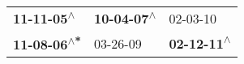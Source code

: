 \begin{supertabular}{lll}
  \textbf{11-11-05\textsuperscript{$\wedge$}} &  \textbf{10-04-07\textsuperscript{$\wedge$}} &                   02-03-10\textsuperscript{} \\
 \textbf{11-08-06\textsuperscript{$\wedge$*}} &                   03-26-09\textsuperscript{} &  \textbf{02-12-11\textsuperscript{$\wedge$}} \\
\end{supertabular}

